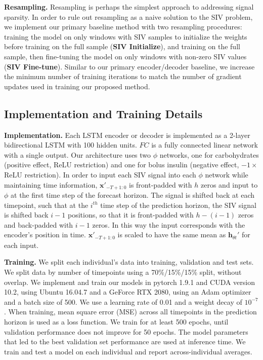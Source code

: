 \documentclass[letterpaper]{article}
\begin{document}
\textbf{Resampling.} Resampling is perhaps the simplest approach to addressing signal sparsity. In order to rule out resampling as a naive solution to the SIV problem, we implement our primary baseline method with two resampling procedures: training the model on only windows with SIV samples to initialize the weights before training on the full sample (\textbf{SIV Initialize}), and training on the full sample, then fine-tuning the model on only windows with non-zero SIV values (\textbf{SIV Fine-tune}).  Similar to our primary encoder/decoder baseline, we increase the minimum number of training iterations to match the number of gradient updates used in training our proposed method.



\subsection{Implementation and Training Details}

\textbf{Implementation.} Each LSTM encoder or decoder is implemented as a 2-layer bidirectional LSTM with 100 hidden units. $FC$ is a fully connected linear network with a single output. Our architecture uses two $\phi$ networks, one for carbohydrates (positive effect, ReLU restriction) and one for bolus insulin (negative effect, $-1 \times $ ReLU restriction).  In order to input each SIV signal into each $\phi$ network while maintaining time information, $\mathbf{x}'_{-T+1:0}$ is front-padded with $h$ zeros and input to $\phi$ at the first time step of the forecast horizon. The signal is shifted back at each timepoint, such that at the $i^{th}$ time step of the prediction horizon, the SIV signal is shifted back $i-1$ positions, so that it is front-padded with $h-(i-1)$ zeros and back-padded with $i-1$ zeros. In this way the input corresponds with the encoder's position in time. $\mathbf{x}'_{-T+1:0}$ is scaled to have the same mean as $\mathbf{h}_{{\theta}t}'$ for each input.

\textbf{Training.} We split each individual's data into training, validation and test sets. We split data by number of timepoints using a 70\%/15\%/15\% split, without overlap. We implement and train our models in pytorch 1.9.1 and CUDA version 10.2, using Ubuntu 16.04.7 and a GeForce RTX 2080, using an Adam optimizer \cite{kn:adam} and a batch size of 500. We use a learning rate of 0.01 and a weight decay of $10^{-7}$. When training, mean square error (MSE) across all timepoints in the prediction horizon is used as a loss function. We train for at least 500 epochs, until validation performance does not improve for 50 epochs. The model parameters that led to the best validation set performance are used at inference time. We train and test a model on each individual and report across-individual averages.
\end{document}
